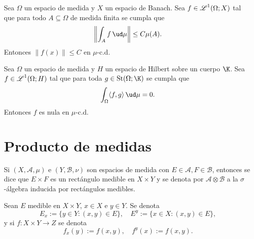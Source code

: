 \begin{cor}\label{thm:finite_inequality_over_ints}
	Sea $\Omega$ un espacio de medida y $X$ un espacio de Banach.
	Sea $f \in \operatorname{\mathscr{L}}^1(\Omega; X)$ tal que para todo $A \subseteq \Omega$ de medida finita se cumpla que
	$$ \left\| \int_{A} f \, \ud \mu \right\| \le C \mu(A). $$
	Entonces $\|f(x)\| \le C$ en $\mu$-c.d.
\end{cor}
\begin{cor}\label{thm:null_kernel_orthoganility}	
	Sea $\Omega$ un espacio de medida y $H$ un espacio de Hilbert sobre un cuerpo $\K$.
	Sea $f \in \operatorname{\mathscr{L}}^1(\Omega; H)$ tal que para toda $g \in \St(\Omega; \K)$ se cumpla que
	$$ \int_{\Omega} \langle f, g \rangle \, \ud \mu = 0. $$
	Entonces $f$ es nula en $\mu$-c.d.
\end{cor}

\section{Producto de medidas}

\begin{mydefi}
	Si $(X, \mathcal{A}, \mu)$ e $(Y, \mathcal{B}, \nu)$ son espacios de medida con $E \in \mathcal{A}, F \in \mathcal{B}$,
	entonces se dice que $E\times F$ es un rectángulo medible en $X\times Y$ y se denota por $\mathcal{A}\otimes\mathcal{B}$ a la $\sigma$-álgebra
	inducida por rectángulos medibles.

	Sean $E$ medible en $X\times Y$, $x \in X$ e $y \in Y$. Se denota
	$$ E_x := \{y\in Y:(x,y)\in E\},\quad E^y := \{x\in X:(x,y)\in E\}, $$
	y si $f\colon X\times Y\to Z$ se denota
	$$ f_x(y) := f(x,y),\quad f^y(x) := f(x,y). $$
\end{mydefi}

